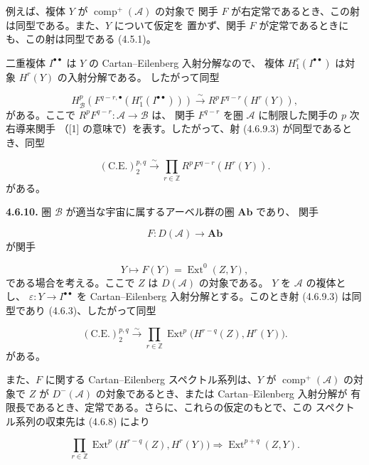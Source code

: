 \clearpage
{}%
\begingroup\small\setlength{\parskip}{0pt}\setlength{\emergencystretch}{1.5em}
\setlength{\abovedisplayskip}{4pt plus 2pt minus 2pt}%
\setlength{\belowdisplayskip}{4pt plus 2pt minus 2pt}%

\noindent 例えば、複体 $Y$ が $\operatorname{comp}^{+}(\mathcal A)$ の対象で
関手 $F$ が右定常であるとき、この射は同型である。また、$Y$ について仮定を
置かず、関手 $F$ が定常であるときにも、この射は同型である (4.5.1)。

二重複体 $I^{\bullet\bullet}$ は $Y$ の Cartan--Eilenberg 入射分解なので、
複体 $H_1^r(I^{\bullet\bullet})$ は対象 $H^r(Y)$ の入射分解である。
したがって同型

\[
H_{\mathcal B}^{p}\left(
F^{q-r,\bullet}(H_1^r(I^{\bullet\bullet}))
\right)
\xrightarrow{\sim}
R^pF^{q-r}(H^r(Y)),
\tag{4.6.9.4}
\]
がある。ここで $R^pF^{q-r}\colon\mathcal A\longrightarrow\mathcal B$ は、
関手 $F^{q-r}$ を圏 $\mathcal A$ に制限した関手の $p$ 次右導来関手
（[1] の意味で）を表す。したがって、射 (4.6.9.3) が同型であるとき、同型

\[
(\mathrm{C.E.})_2^{p,q}\xrightarrow{\sim}
\prod_{r\in\mathbb Z}R^pF^{q-r}(H^r(Y)).
\tag{4.6.9.5}
\]
がある。

\medskip\noindent\textbf{4.6.10.}\quad
圏 $\mathcal B$ が適当な宇宙に属するアーベル群の圏 $\mathbf{Ab}$ であり、
関手

\[
F\colon D(\mathcal A)\longrightarrow\mathbf{Ab}
\]
が関手

\[
Y\longmapsto F(Y)=\operatorname{Ext}^{0}(Z,Y),
\]
である場合を考える。ここで $Z$ は $D(\mathcal A)$ の対象である。
$Y$ を $\mathcal A$ の複体とし、
$\varepsilon\colon Y\longrightarrow I^{\bullet\bullet}$ を
Cartan--Eilenberg 入射分解とする。このとき射 (4.6.9.3) は同型であり
(4.6.3)、したがって同型

\[
(\mathrm{C.E.})_2^{p,q}\xrightarrow{\sim}
\prod_{r\in\mathbb Z}
\operatorname{Ext}^{p}\bigl(H^{r-q}(Z),H^r(Y)\bigr).
\tag{4.6.10.1}
\]
がある。

また、$F$ に関する Cartan--Eilenberg スペクトル系列は、$Y$ が
$\operatorname{comp}^{+}(\mathcal A)$ の対象で $Z$ が
$D^{-}(\mathcal A)$ の対象であるとき、または Cartan--Eilenberg 入射分解が
有限長であるとき、定常である。さらに、これらの仮定のもとで、この
スペクトル系列の収束先は (4.6.8) により

\[
\prod_{r\in\mathbb Z}
\operatorname{Ext}^{p}\bigl(H^{r-q}(Z),H^r(Y)\bigr)
\Longrightarrow
\operatorname{Ext}^{p+q}(Z,Y).
\]
\endgroup
